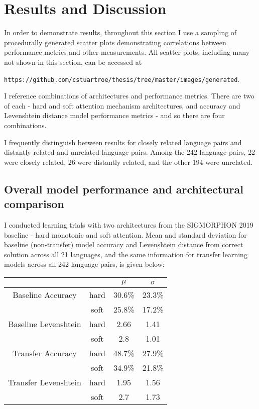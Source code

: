 \chapter{Results and Discussion}

In order to demonstrate results, throughout this section I use a sampling of procedurally generated scatter plots demonstrating correlations between performance metrics and other measurements. All scatter plots, including many not shown in this section, can be accessed at

\texttt{https://github.com/cstuartroe/thesis/tree/master/images/generated}.

I reference combinations of architectures and performance metrics. There are two of each - hard and soft attention mechanism architectures, and accuracy and Levenshtein distance model performance metrics - and so there are four combinations.

I frequently distinguish between results for closely related language pairs and distantly related and unrelated language pairs. Among the 242 language pairs, 22 were closely related, 26 were distantly related, and the other 194 were unrelated.

\section{Overall model performance and architectural comparison}
\label{modelperf}

I conducted learning trials with two architectures from the SIGMORPHON 2019 baseline - hard monotonic and soft attention. Mean and standard deviation for baseline (non-transfer) model accuracy and Levenshtein distance from correct solution across all 21 languages, and the same information for transfer learning models across all 242 language pairs, is given below:

\begin{center}
\begin{tabular}{|c|c||c|c|}
\hline
 & & $\mu$ & $\sigma$ \\
\hline \hline
Baseline Accuracy & hard & 30.6\% & 23.3\% \\
\hline
 & soft & 25.8\% & 17.2\% \\
\hline
Baseline Levenshtein & hard & 2.66 & 1.41 \\
\hline
 & soft & 2.8 & 1.01 \\
\hline
Transfer Accuracy & hard & 48.7\% & 27.9\%\\
\hline
 & soft & 34.9\% & 21.8\%\\
\hline
Transfer Levenshtein & hard & 1.95 & 1.56\\
\hline
 & soft & 2.7 & 1.73\\
\hline
\end{tabular}
\end{center}

